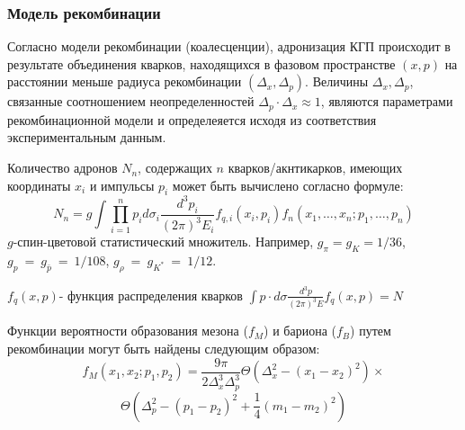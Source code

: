 \subsubsection{Модель рекомбинации} \label{sssec:ch1/sec1_3}
Согласно модели рекомбинации (коалесценции), адронизация КГП происходит в результате объединения кварков, находящихся в фазовом пространстве $(x, p)$ на расстоянии меньше радиуса рекомбинации $(\Delta_x, \Delta_p)$. Величины $\Delta_x, \Delta_p$, связанные соотношением неопределенностей $\Delta_p \cdot \Delta_x \approx 1$, являются параметрами рекомбинационной модели и определеяется исходя из соответствия экспериментальным данным.


\begin{comment}
	Количество мезонов, имеющих определенный импульс P может быть вычислено согласно следующей формуле
	$$\frac{dN_M}{d^3 P}=\sum_{a,b}\int \frac{d^3 R}{2\pi^3} \frac{d^3 q d^3 r}{2\pi^3}  W_{ab}(R-\frac{r}{2},\frac{P}{2}-q;R+\frac{r}{2},\frac{P}{2}+q) \Phi_M (r,q) $$
	Где индекс $M$ обозначает мезон, а индексы $a$ и $b$ обозначают коалесцирующие валентные кварки. $W_{ab}$ и $\Phi_M$ – функции Вигнера для партонов и мезона соответственно, $P$ и $R$ – импульс и координата мезона, $q$ и $r$ – доли импульса, которые несут кварки, и координаты кварков. Суммирование производится по всем возможным комбинациям 
\end{comment}

Количество адронов $N_n$, содержащих $n$ кварков/акнтикарков, имеющих координаты $x_i$ и импульсы $p_i$  может быть вычислено согласно формуле:
$$ N_n=g\int \prod_{i=1}^n p_i d\sigma_i  \frac{d^3 p_i}{(2\pi)^3 E_i }  f_{q,i} (x_i,p_i ) f_n(x_1,…,x_n;p_1,…,p_n ) $$
$g$-спин-цветовой статистический множитель.
Например, $g_\pi=g_K=1/36$, $g_p~=~g_{\bar{p}}~=~1/108$, $g_\rho~=~g_{K^*}~=~1/12$.

$f_q (x,p)$- функция распределения кварков 
$\int p\cdot d\sigma \frac{d^3 p}{(2\pi)^3 E} f_q(x,p)=N$

Функции вероятности образования мезона ($f_M$) и бариона ($f_B$) путем рекомбинации могут быть найдены следующим образом:
$$f_M (x_1,x_2;p_1,p_2 )=\frac{9 \pi}{2\Delta_{x}^3 \Delta_{p}^3} \Theta \left( \Delta_{x}^2 - (x_1 - x_2)^2  \right) \times$$
$$ \Theta \left( \Delta_{p}^2 - (p_1 - p_2)^2  + \frac{1}{4}(m_1 - m_2)^2 \right) $$


